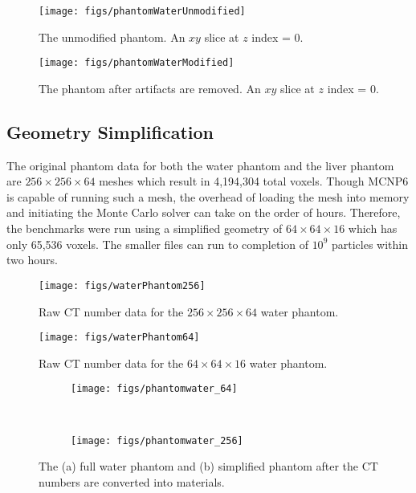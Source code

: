 \begin{figure}[tb]
  \begin{center}
   \texttt{[image: figs/phantomWaterUnmodified]}
  \end{center}
  \caption{The unmodified phantom. An $xy$ slice at $z$ index = 0.}
\label{fig:phantomWaterUnmodified}
\end{figure}

\begin{figure}[tb]
  \begin{center}
   \texttt{[image: figs/phantomWaterModified]}
  \end{center}
  \caption{The phantom after artifacts are removed. An $xy$ slice at $z$ index = 0.}
\label{fig:phantomWaterModified}
\end{figure}

\subsection{Geometry Simplification}
The original phantom data for both the water phantom and the liver phantom are $256\times256\times64$ meshes which result in 4,194,304 total voxels. Though MCNP6 is capable of running such a mesh, the overhead of loading the mesh into memory and initiating the Monte Carlo solver can take on the order of hours. Therefore, the benchmarks were run using a simplified geometry of $64\times64\times16$ which has only 65,536 voxels. The smaller files can run to completion of $10^9$ particles within two hours.

\begin{figure}[tb]
  \begin{center}
   \texttt{[image: figs/waterPhantom256]}
  \end{center}
  \caption{Raw CT number data for the $256 \times 256 \times 64$ water phantom.}
\label{fig:waterPhantom256}
\end{figure}

\begin{figure}[tb]
  \begin{center}
   \texttt{[image: figs/waterPhantom64]}
  \end{center}
  \caption{Raw CT number data for the $64 \times 64 \times 16$ water phantom.}
\label{fig:waterPhantom64}
\end{figure}

\begin{figure}
    \centering
    \begin{subfigure}[b]{0.45\textwidth}
        \texttt{[image: figs/phantomwater\_64]}
        \caption{}
        \label{fig:waterHistLin}
    \end{subfigure}
    ~
    \begin{subfigure}[b]{0.45\textwidth}
        \texttt{[image: figs/phantomwater\_256]}
        \caption{}
        \label{fig:waterHistLog}
    \end{subfigure}
    \caption{The (a) full water phantom and (b) simplified phantom after the CT numbers are converted into materials.}\label{fig:waterHist}
\end{figure}

